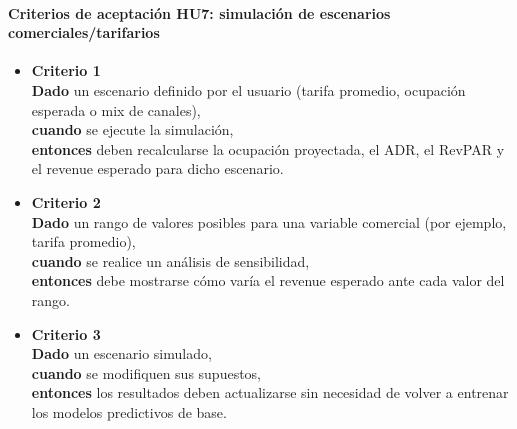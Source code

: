 \documentclass[
11pt, %
]{charter}
\begin{document}
\paragraph{Criterios de aceptación HU7: simulación de escenarios comerciales/tarifarios}
\begin{itemize}
  \item \textbf{Criterio 1} \\
  \textbf{Dado} un escenario definido por el usuario (tarifa promedio, ocupación esperada o mix de canales), \\
  \textbf{cuando} se ejecute la simulación, \\
  \textbf{entonces} deben recalcularse la ocupación proyectada, el ADR, el RevPAR y el revenue esperado para dicho escenario.

  \item \textbf{Criterio 2} \\
  \textbf{Dado} un rango de valores posibles para una variable comercial (por ejemplo, tarifa promedio), \\
  \textbf{cuando} se realice un análisis de sensibilidad, \\
  \textbf{entonces} debe mostrarse cómo varía el revenue esperado ante cada valor del rango.

  \item \textbf{Criterio 3} \\
  \textbf{Dado} un escenario simulado, \\
  \textbf{cuando} se modifiquen sus supuestos, \\
  \textbf{entonces} los resultados deben actualizarse sin necesidad de volver a entrenar los modelos predictivos de base.
\end{itemize}

\vspace{1em}
\end{document}
